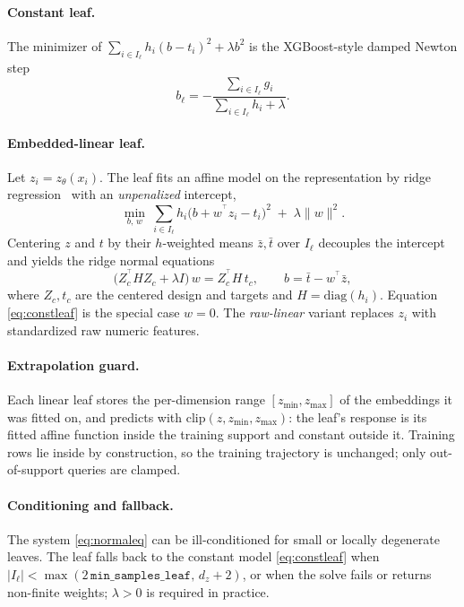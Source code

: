 \documentclass[11pt]{article}
\newcommand{\zt}{z_{\theta}}
\newcommand{\Il}{I_{\ell}}
\newcommand{\trans}{^{\top}}
\begin{document}
\paragraph{Constant leaf.}
The minimizer of $\sum_{i \in \Il} h_i (b - t_i)^2 + \lambda b^2$ is the
XGBoost-style damped Newton step
\begin{equation}
b_{\ell} = -\frac{\sum_{i \in \Il} g_i}{\sum_{i \in \Il} h_i + \lambda}.
\label{eq:constleaf}
\end{equation}

\paragraph{Embedded-linear leaf.}
Let $z_i = \zt(x_i)$. The leaf fits an affine model on the representation by ridge
regression~\citep{hoerl1970ridge} with an \emph{unpenalized} intercept,
\begin{equation}
\min_{b,\, w} \ \sum_{i \in \Il} h_i \big( b + w^{\!\trans} z_i - t_i \big)^2
\;+\; \lambda \lVert w \rVert^2 .
\label{eq:linleaf}
\end{equation}
Centering $z$ and $t$ by their $h$-weighted means $\bar z, \bar t$ over $\Il$
decouples the intercept and yields the ridge normal equations
\begin{equation}
\big( Z_c^{\!\trans} H Z_c + \lambda I \big)\, w = Z_c^{\!\trans} H\, t_c,
\qquad
b = \bar t - w^{\!\trans} \bar z,
\label{eq:normaleq}
\end{equation}
where $Z_c, t_c$ are the centered design and targets and $H = \mathrm{diag}(h_i)$.
Equation \eqref{eq:constleaf} is the special case $w = 0$. The \emph{raw-linear}
variant replaces $z_i$ with standardized raw numeric features.

\paragraph{Extrapolation guard.}
Each linear leaf stores the per-dimension range $[z_{\min}, z_{\max}]$ of the
embeddings it was fitted on, and predicts with $\mathrm{clip}(z, z_{\min}, z_{\max})$:
the leaf's response is its fitted affine function inside the training support and
constant outside it. Training rows lie inside by construction, so the training
trajectory is unchanged; only out-of-support queries are clamped.

\paragraph{Conditioning and fallback.}
The system \eqref{eq:normaleq} can be ill-conditioned for small or locally degenerate
leaves. The leaf falls back to the constant model \eqref{eq:constleaf} when
$\lvert \Il \rvert < \max(2\,\texttt{min\_samples\_leaf},\, d_z + 2)$, or when the
solve fails or returns non-finite weights; $\lambda > 0$ is required in practice.
\end{document}
